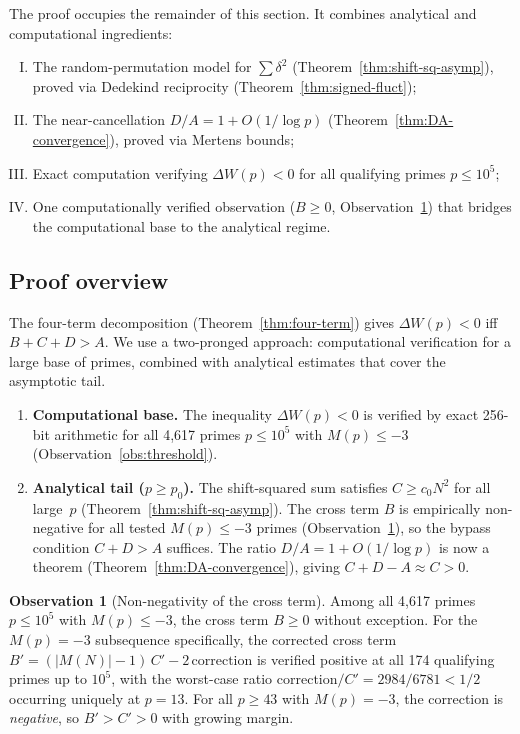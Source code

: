 \documentclass[11pt]{article}
\theoremstyle{definition}
\newtheorem{observation}[theorem]{Observation}
\begin{document}
The proof occupies the remainder of this section.  It combines
analytical and computational ingredients:
\begin{enumerate}[(I)]
  \item The random-permutation model for $\sum \delta^2$
    (Theorem~\ref{thm:shift-sq-asymp}), proved via Dedekind
    reciprocity (Theorem~\ref{thm:signed-fluct});
  \item The near-cancellation $D/A = 1 + O(1/\log p)$
    (Theorem~\ref{thm:DA-convergence}), proved via Mertens bounds;
  \item Exact computation verifying $\Delta W(p) < 0$ for all
    qualifying primes $p \le 10^5$;
  \item One computationally verified observation ($B \ge 0$,
    Observation~\ref{obs:B-nonneg}) that bridges the
    computational base to the analytical regime.
\end{enumerate}

\subsection{Proof overview}\label{sec:sign-overview}

The four-term decomposition (Theorem~\ref{thm:four-term}) gives
$\Delta W(p) < 0$ iff $B + C + D > A$.  We use a two-pronged approach:
computational verification for a large base of primes, combined with
analytical estimates that cover the asymptotic tail.

\begin{enumerate}
  \item \textbf{Computational base.}  The inequality $\Delta W(p) < 0$
    is verified by exact 256-bit arithmetic for all 4,617 primes
    $p \le 10^5$ with $M(p) \le -3$ (Observation~\ref{obs:threshold}).
  \item \textbf{Analytical tail ($p \ge p_0$).}
    The shift-squared sum satisfies $C \ge c_0 N^2$ for all large~$p$
    (Theorem~\ref{thm:shift-sq-asymp}).  The cross term $B$ is
    empirically non-negative for all tested $M(p) \le -3$ primes
    (Observation~\ref{obs:B-nonneg}), so the bypass condition
    $C + D > A$ suffices.  The ratio $D/A = 1 + O(1/\log p)$ is
    now a theorem (Theorem~\ref{thm:DA-convergence}), giving
    $C + D - A \approx C > 0$.
\end{enumerate}

\begin{observation}[Non-negativity of the cross term]\label{obs:B-nonneg}
Among all 4{,}617 primes $p \le 10^5$ with $M(p) \le -3$, the cross term
$B \ge 0$ without exception.  For the $M(p) = -3$ subsequence specifically,
the corrected cross term $B' = (|M(N)|-1)\,C' - 2\,\mathrm{correction}$
is verified positive at all 174 qualifying primes up to $10^5$, with the
worst-case ratio $\mathrm{correction}/C' = 2984/6781 < 1/2$ occurring
uniquely at $p = 13$.  For all $p \ge 43$ with $M(p) = -3$, the correction
is \emph{negative}, so $B' > C' > 0$ with growing margin.
\end{observation}
\end{document}
